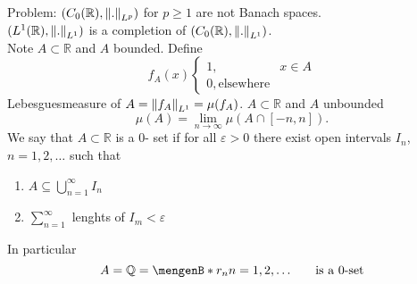 \begin{bemerkung}
\begin{itemize}
		Problem: $(C_0(\mathbb{R}), \norm{.}_{L^p})$ for $p \geq 1$ are not Banach spaces. \\
		$(L^1(\mathbb{R}),\norm{.}_{L^1})$ is a completion of $(C_0(\mathbb{R}),\norm{.}_{L^1})$. \\
		Note $A \subset \mathbb{R}$ and $A$ bounded. Define
		\[
			f_A(x) \begin{cases}
				1, & x \in A\\
				0, \text{elsewhere}
			\end{cases}
		\]
		Lebesguesmeasure of $A = \norm{f_A}_{L^1} = \mu(f_A)$. $A \subset \mathbb{R}$ and $A$ unbounded
		\[
			\mu(A) = \lim_{n \to \infty} \mu ( A \cap [-n,n]).
		\]
		We say that $A \subset \mathbb{R}$ is a $0$- set if for all $\varepsilon >0$ there exist open intervals $I_n$, $n=1,2, \dots$ such that
		\begin{enumerate}[(1)]
			\item $ A \subseteq \bigcup_{n=1}^{\infty}I_n$
			\item $\sum_{n=1}^{\infty}$ lenghts of $I_m < \varepsilon$
		\end{enumerate} 
		In particular
		\[
			A = \mathbb{Q} = \set[r_n]{n=1,2,\dots}\qquad \text{is a $0$-set}	
		\]
	\end{itemize}
\end{bemerkung}
\newpage
